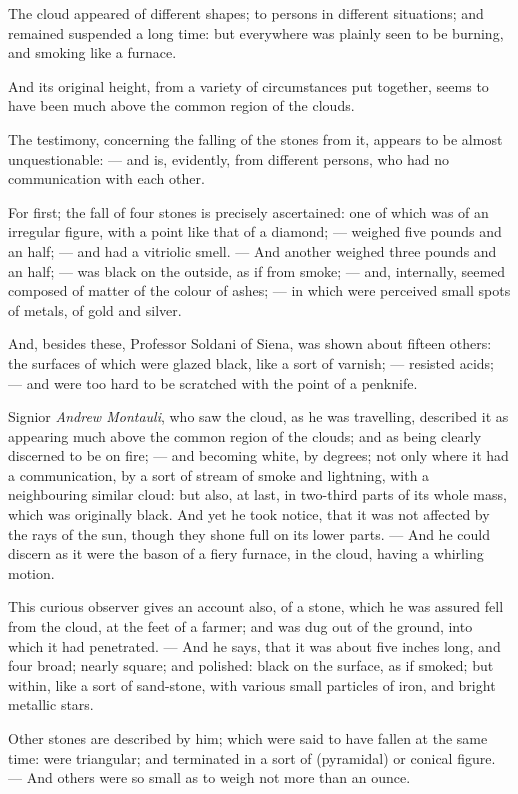 \documentclass[a4paper, 12pt, oneside, twocolumn]{article}
\begin{document}
The cloud appeared of different shapes; to persons in different situations; and remained suspended a long time: but everywhere was plainly seen to be burning, and smoking like a furnace.

And its original height, from a variety of circumstances put together, seems to have been much above the common region of the clouds.

The testimony, concerning the falling of the stones from it, appears to be almost unquestionable: --- and is, evidently, from different persons, who had no communication with each other.

For first; the fall of four stones is precisely ascertained: one of which was of an irregular figure, with a point like that of a diamond; --- weighed five pounds and an half; --- and had a vitriolic smell. --- And another weighed three pounds and an half; --- was black on the outside, as if from smoke; --- and, internally, seemed composed of matter of the colour of ashes; --- in which were perceived small spots of metals, of gold and silver.

And, besides these, Professor Soldani of Siena, was shown about fifteen others: the surfaces of which were glazed black, like a sort of varnish; --- resisted acids; --- and were too hard to be scratched with the point of a penknife.

Signior \emph{Andrew Montauli}, who saw the cloud, as he was travelling, described it as appearing much above the common region of the clouds; and as being clearly discerned to be on fire; --- and becoming white, by degrees; not only where it had a communication, by a sort of stream of smoke and lightning, with a neighbouring similar cloud: but also, at last, in two-third parts of its whole mass, which was originally black. And yet he took notice, that it was not affected by the rays of the sun, though they shone full on its lower parts. --- And he could discern as it were the bason of a fiery furnace, in the cloud, having a whirling motion.

This curious observer gives an account also, of a stone, which he was assured fell from the cloud, at the feet of a farmer; and was dug out of the ground, into which it had penetrated. --- And he says, that it was about five inches long, and four broad; nearly square; and polished: black on the surface, as if smoked; but within, like a sort of sand-stone, with various small particles of iron, and bright metallic stars.

Other stones are described by him; which were said to have fallen at the same time: were triangular; and terminated in a sort of (pyramidal) or conical figure. --- And others were so small as to weigh not more than an ounce.
\end{document}

